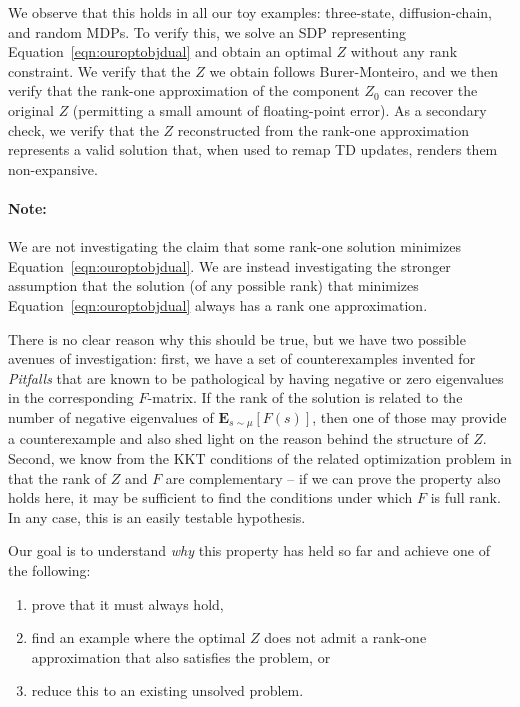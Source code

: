 \documentclass[11pt]{article}
\newcommand{\E}{\textbf{E}}
\begin{document}
We observe that this holds in all our toy examples: three-state, diffusion-chain, and random MDPs. To verify this, we solve an SDP representing Equation~\ref{eqn:ouroptobjdual} and obtain an optimal $Z$ without any rank constraint. We verify that the $Z$ we obtain follows Burer-Monteiro, and we then verify that the rank-one approximation of the component $Z_0$ can recover the original $Z$ (permitting a small amount of floating-point error). As a secondary check, we verify that the $Z$ reconstructed from the rank-one approximation represents a valid solution that, when used to remap TD updates, renders them non-expansive.

\paragraph{Note:}
We are not investigating the claim that some rank-one solution minimizes Equation~\ref{eqn:ouroptobjdual}. We are instead investigating the stronger assumption that the solution (of any possible rank) that minimizes Equation~\ref{eqn:ouroptobjdual} always has a rank one approximation.

There is no clear reason why this should be true, but we have two possible avenues of investigation: first, we have a set of counterexamples invented for \emph{Pitfalls} \cite{manek2022pitfalls} that are known to be pathological by having negative or zero eigenvalues in the corresponding $F$-matrix. If the rank of the solution is related to the number of negative eigenvalues of $\E_{s\sim\mu} [F(s)]$, then one of those may provide a counterexample and also shed light on the reason behind the structure of $Z$. Second, we know from the KKT conditions of the related optimization problem in \cite{kolter2011fixed} that the rank of $Z$ and $F$ are complementary -- if we can prove the property also holds here, it may be sufficient to find the conditions under which $F$ is full rank. In any case, this is an easily testable hypothesis.

Our goal is to understand \emph{why} this property has held so far and achieve one of the following:
\begin{enumerate}
  \item prove that it must always hold,
  \item find an example where the optimal $Z$ does not admit a rank-one approximation that also satisfies the problem, or
  \item reduce this to an existing unsolved problem.
\end{enumerate}
\end{document}
